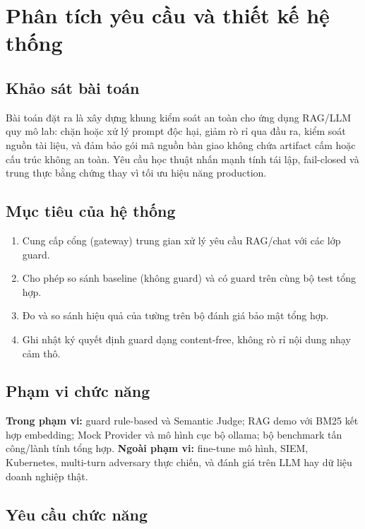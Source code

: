 \chapter{Phân tích yêu cầu và thiết kế hệ thống}
\label{ch:phan-tich-thiet-ke}

\section{Khảo sát bài toán}

Bài toán đặt ra là xây dựng khung kiểm soát an toàn cho ứng dụng RAG/LLM quy mô lab: chặn hoặc xử lý prompt độc hại, giảm rò rỉ qua đầu ra, kiểm soát nguồn tài liệu, và đảm bảo gói mã nguồn bàn giao không chứa artifact cấm hoặc cấu trúc không an toàn. Yêu cầu học thuật nhấn mạnh tính tái lập, fail-closed và trung thực bằng chứng thay vì tối ưu hiệu năng production.

\section{Mục tiêu của hệ thống}

\begin{enumerate}
    \item Cung cấp cổng (gateway) trung gian xử lý yêu cầu RAG/chat với các lớp guard.
    \item Cho phép so sánh baseline (không guard) và có guard trên cùng bộ test tổng hợp.
    \item Đo và so sánh hiệu quả của tường trên bộ đánh giá bảo mật tổng hợp.
    \item Ghi nhật ký quyết định guard dạng content-free, không rò rỉ nội dung nhạy cảm thô.
\end{enumerate}

\section{Phạm vi chức năng}

\textbf{Trong phạm vi:} guard rule-based và Semantic Judge; RAG demo với BM25 kết hợp embedding; Mock Provider và mô hình cục bộ ollama; bộ benchmark tấn công/lành tính tổng hợp. \textbf{Ngoài phạm vi:} fine-tune mô hình, SIEM, Kubernetes, multi-turn adversary thực chiến, và đánh giá trên LLM hay dữ liệu doanh nghiệp thật.

\section{Yêu cầu chức năng}

